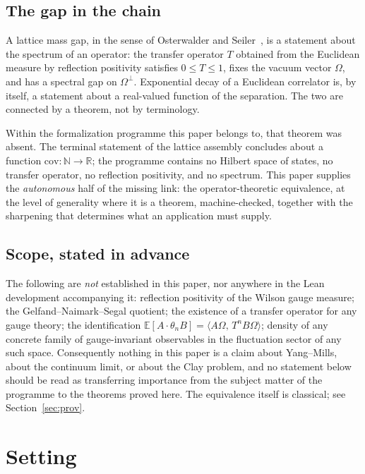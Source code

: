 \documentclass[11pt]{article}
\theoremstyle{definition}
\newcommand{\R}{\mathbb{R}}
\newcommand{\Om}{\Omega}
\newcommand{\inn}[2]{\langle #1,\, #2\rangle}
\begin{document}
\subsection*{The gap in the chain}

A lattice mass gap, in the sense of Osterwalder and
Seiler~\cite{OsterwalderSeiler}, is a statement about the spectrum of an
operator: the transfer operator $T$ obtained from the Euclidean measure
by reflection positivity satisfies $0 \le T \le 1$, fixes the vacuum
vector $\Om$, and has a spectral gap on $\Om^\perp$.  Exponential decay
of a Euclidean correlator is, by itself, a statement about a
real-valued function of the separation.  The two are connected by a
theorem, not by terminology.

Within the formalization programme this paper belongs to, that theorem
was absent.  The terminal statement of the lattice assembly concludes
about a function $\mathrm{cov} : \mathbb{N} \to \R$; the programme
contains no Hilbert space of states, no transfer operator, no reflection
positivity, and no spectrum.  This paper supplies the \emph{autonomous}
half of the missing link: the operator-theoretic equivalence, at the
level of generality where it is a theorem, machine-checked, together
with the sharpening that determines what an application must supply.

\subsection*{Scope, stated in advance}

The following are \emph{not} established in this paper, nor anywhere in
the Lean development accompanying it:
reflection positivity of the Wilson gauge measure; the
Gelfand--Naimark--Segal quotient; the existence of a transfer operator
for any gauge theory; the identification
$\mathbb{E}[A \cdot \theta_n B] = \inn{A\Om}{T^n B\Om}$; density of any
concrete family of gauge-invariant observables in the fluctuation sector
of any such space.  Consequently nothing in this paper is a claim about
Yang--Mills, about the continuum limit, or about the Clay problem, and no
statement below should be read as transferring importance from the
subject matter of the programme to the theorems proved here.  The
equivalence itself is classical; see Section~\ref{sec:prov}.

\section{Setting}
\end{document}
